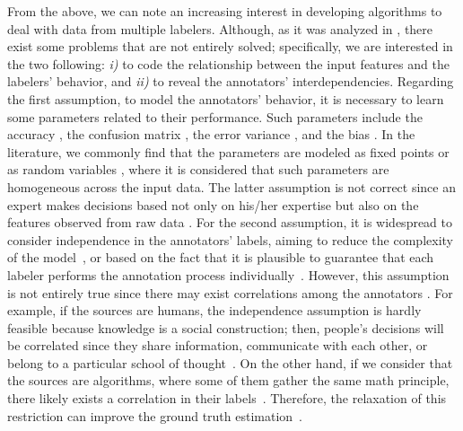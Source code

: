 \documentclass[journal]{IEEEtran}
\begin{document}
From the above, we can note an increasing interest in developing algorithms to deal with data from multiple labelers. Although, as it was analyzed in \cite{g2019machine}, there exist some problems that are not entirely solved; specifically, we are interested in the two following: \textit{i)} to code the relationship between the input features and the labelers' behavior, and \textit{ii)} to reveal the annotators' interdependencies. Regarding the first assumption, to model the annotators' behavior, it is necessary to learn some parameters related to their performance. Such parameters include the accuracy \cite{rodrigues2013learning}, the confusion matrix \cite{gonzalez2015automatic}, the error variance \cite{raykar2010learning}, and the bias \cite{rodrigues2017learning}. In the literature, we commonly find that the parameters are modeled as fixed points \cite{rodrigues2014gaussian} or as random variables \cite{morales2019scalable}, where it is considered that such parameters are homogeneous across the input data. The latter assumption is not correct since an expert makes decisions based not only on his/her expertise but also on the features observed from raw data \cite{raykar2010learning}. For the second assumption, it is widespread to consider independence in the annotators' labels, aiming to reduce the complexity of the model~\cite{venanzi2014community}, or based on the fact that it is plausible to guarantee that each labeler performs the annotation process individually~\cite{tang2019leveraging}. However, this assumption is not entirely true since there may exist correlations among the annotators \cite{zhang2011learning}. For example, if the sources are humans, the independence assumption is hardly feasible because knowledge is a social construction; then, people's decisions will be correlated since they share information, communicate with each other, or belong to a particular school of thought~\cite{surowiecki2005wisdom,hahn2018communication}. On the other hand, if we consider that the sources are algorithms, where some of them gather the same math principle, there likely exists a correlation in their labels~\cite{zhu2019unsupervised}. Therefore, the relaxation of this restriction can improve the ground truth estimation~\cite{g2019machine}.
\end{document}
